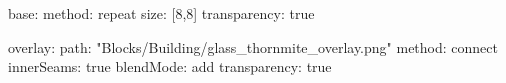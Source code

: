 base:
  method: repeat
  size: [8,8]
  transparency: true

overlay:
  path: "Blocks/Building/glass_thornmite_overlay.png"
  method: connect
  innerSeams: true
  blendMode: add
  transparency: true